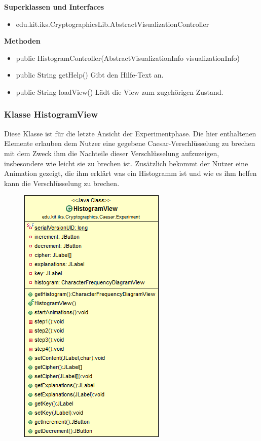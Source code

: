 \documentclass{article}
\begin{document}
      \textbf{Superklassen und Interfaces}
      \begin{itemize}
        \item edu.kit.iks.CryptographicsLib.AbstractVisualizationController
      \end{itemize}

      \textbf{Methoden}
      \begin{itemize}
        \item public HistogramController(AbstractVisualizationInfo visualizationInfo)
        \item public String getHelp() \newline
        Gibt den Hilfe-Text an.
        \item public String loadView() \newline
        Lädt die View zum zugehörigen Zustand.
      \end{itemize}

\subsubsection{Klasse HistogramView}
      Diese Klasse ist für die letzte Ansicht der Experimentphase. Die hier enthaltenen Elemente erlauben dem Nutzer eine gegebene Caesar-Verschlüsselung zu brechen mit dem Zweck ihm die Nachteile dieser Verschlüsselung aufzuzeigen, insbesondere wie leicht sie zu brechen ist. Zusätzlich bekommt der Nutzer eine Animation gezeigt, die ihm erklärt was ein Histogramm ist und wie es ihm helfen kann die Verschlüsselung zu brechen.

      \begin{figure}[H]
        \centering
        \includegraphics{resources/edu-kit-iks-Cryptographics-Caesar-Experiment-HistogramView}
      \end{figure}
\end{document}
